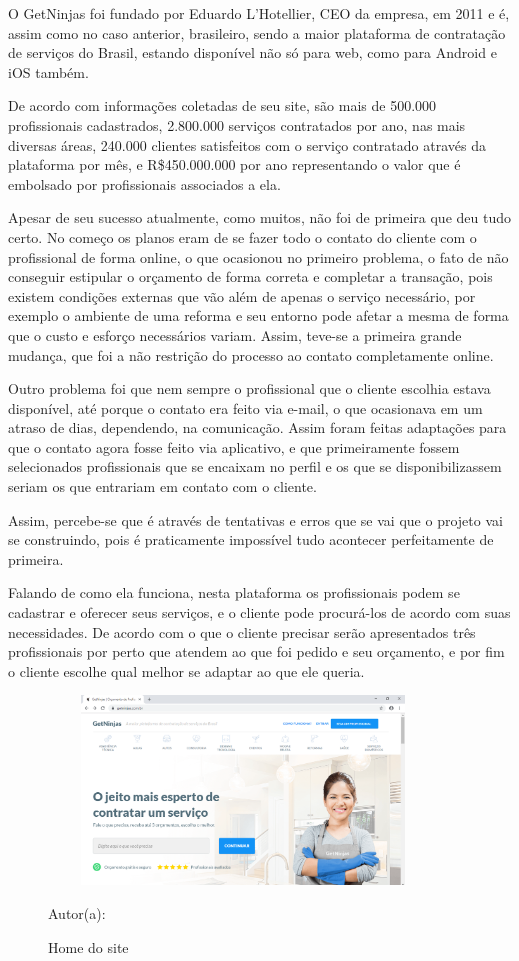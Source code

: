 O GetNinjas foi fundado por Eduardo L’Hotellier, CEO da empresa, em 2011 e é, assim como no caso anterior, brasileiro, sendo a maior plataforma de contratação de serviços do Brasil, estando disponível não só para web, como para Android e iOS também.

De acordo com informações coletadas de seu site, são mais de 500.000 profissionais cadastrados, 2.800.000 serviços contratados por ano, nas mais diversas áreas, 240.000 clientes satisfeitos com o serviço contratado através da plataforma por mês, e R\$450.000.000 por ano representando o valor que é embolsado por profissionais associados a ela.

Apesar de seu sucesso atualmente, como muitos, não foi de primeira que deu tudo certo. No começo os planos eram de se fazer todo o contato do cliente com o profissional de forma online, o que ocasionou no primeiro problema, o fato de não conseguir estipular o orçamento de forma correta e completar a transação, pois existem condições externas que vão além de apenas o serviço necessário, por exemplo o ambiente de uma reforma e seu entorno pode afetar a mesma de forma que o custo e esforço necessários variam. Assim, teve-se a primeira grande mudança, que foi a não restrição do processo ao contato completamente online.

Outro problema foi que nem sempre o profissional que o cliente escolhia estava disponível, até porque o contato era feito via e-mail, o que ocasionava em um atraso de dias, dependendo, na comunicação. Assim foram feitas adaptações para que o contato agora fosse feito via aplicativo, e que primeiramente fossem selecionados profissionais que se encaixam no perfil e os que se disponibilizassem seriam os que entrariam em contato com o cliente.

Assim, percebe-se que é através de tentativas e erros que se vai que o projeto vai se construindo, pois é praticamente impossível tudo acontecer perfeitamente de primeira.

Falando de como ela funciona, nesta plataforma os profissionais podem se cadastrar e oferecer seus serviços, e o cliente pode procurá-los de acordo com suas necessidades. De acordo com o que o cliente precisar serão apresentados três profissionais por perto que atendem ao que foi pedido e seu orçamento, e por fim o cliente escolhe qual melhor se adaptar ao que ele queria.

\begin{figure}[!h]
	\centering
	\caption{Home do site}
	\includegraphics[width=390px, height=190px]{./images/getninjas.png}
	\par {Autor(a): \cite{get-ninjas}}
\end{figure}

